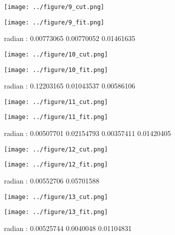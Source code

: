 \documentclass{article}
\begin{document}
 \begin{figure}[H]
\begin{minipage}{0.48\linewidth}
  \centerline{\texttt{[image: ../figure/9\_cut.png]}}
\end{minipage}
\hfill
\begin{minipage}{0.48\linewidth}
  \centerline{\texttt{[image: ../figure/9\_fit.png]}}
\end{minipage}
\caption{radian : 0.00773065 0.00770052 0.01461635}
\end{figure}

 \begin{figure}[H]
\begin{minipage}{0.48\linewidth}
  \centerline{\texttt{[image: ../figure/10\_cut.png]}}
\end{minipage}
\hfill
\begin{minipage}{0.48\linewidth}
  \centerline{\texttt{[image: ../figure/10\_fit.png]}}
\end{minipage}
\caption{radian : 0.12203165 0.01043537 0.00586106}
\end{figure}

 \begin{figure}[H]
\begin{minipage}{0.48\linewidth}
  \centerline{\texttt{[image: ../figure/11\_cut.png]}}
\end{minipage}
\hfill
\begin{minipage}{0.48\linewidth}
  \centerline{\texttt{[image: ../figure/11\_fit.png]}}
\end{minipage}
\caption{radian : 0.00507701 0.02154793 0.00357411 0.01420405}
\end{figure}

 \begin{figure}[H]
\begin{minipage}{0.48\linewidth}
  \centerline{\texttt{[image: ../figure/12\_cut.png]}}
\end{minipage}
\hfill
\begin{minipage}{0.48\linewidth}
  \centerline{\texttt{[image: ../figure/12\_fit.png]}}
\end{minipage}
\caption{radian : 0.00552706 0.05701588}
\end{figure}


 \begin{figure}[H]
\begin{minipage}{0.48\linewidth}
  \centerline{\texttt{[image: ../figure/13\_cut.png]}}
\end{minipage}
\hfill
\begin{minipage}{0.48\linewidth}
  \centerline{\texttt{[image: ../figure/13\_fit.png]}}
\end{minipage}
\caption{radian : 0.00525744 0.0040048  0.01104831}
\end{figure}
\end{document}
